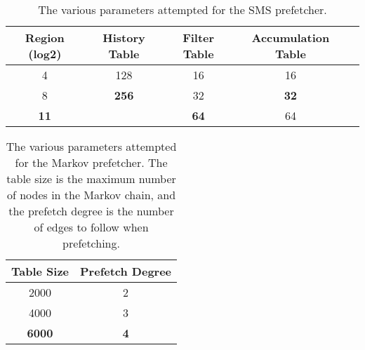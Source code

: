 \begin{table}[htbp]
  \centering
  \begin{tabular}{|c|c|c|c|c|}
    \hline
    \textbf{Region (log2)} & \textbf{History Table} & \textbf{Filter Table} & \textbf{Accumulation Table} \\ \hline
    4  & 128 & 16 & 16 \\ \hline
    8  & \textbf{256} & 32&  \textbf{32}\\ \hline
    \textbf{11} &     & \textbf{64}&  64\\ \hline
  \end{tabular}
  \caption{The various parameters attempted for the SMS prefetcher.}
  \label{tab:smssettings}
\end{table}

\begin{table}[htbp]
  \centering
  \begin{tabular}{|c|c|}
    \hline
    \textbf{Table Size} & \textbf{Prefetch Degree} \\ \hline
    2000 & 2 \\ \hline
    4000 & 3 \\ \hline
    \textbf{6000} & \textbf{4} \\ \hline
  \end{tabular}
  \caption{The various parameters attempted for the Markov prefetcher. The table size is the maximum number of nodes in the Markov chain, and the prefetch degree is the number of edges to follow when prefetching.}
  \label{tab:markovsettings}
\end{table}






